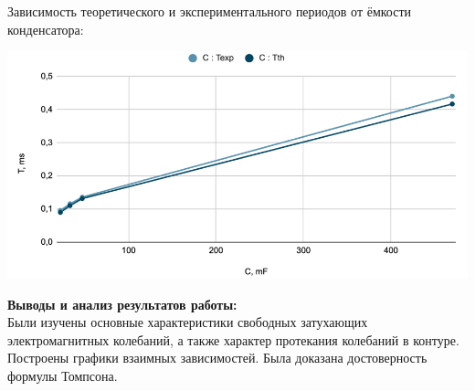 \documentclass[12pt,a4paper]{report}
\begin{document}
Зависимость теоретического и экспериментального периодов от ёмкости конденсатора: \\
\begin{center}
    \includegraphics[width=\textwidth]{graph3.png}
\end{center}
\hfill\break
\textbf{Выводы и анализ результатов работы:} \\
\hfill\break
Были изучены основные характеристики свободных затухающих электромагнитных
колебаний, а также характер протекания колебаний в
контуре. Построены графики взаимных зависимостей. Была доказана
достоверность формулы Томпсона.
\end{document}
